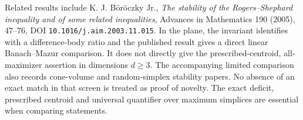 \documentclass[11pt]{article}
\begin{document}
Related results include K. J. B\"or\"oczky Jr.,
\emph{The stability of the Rogers--Shephard inequality and of some related
inequalities}, Advances in Mathematics 190 (2005), 47--76,
DOI \nolinkurl{10.1016/j.aim.2003.11.015}. In the plane, the invariant identifies
with a difference-body ratio and the published result gives a direct linear
Banach--Mazur comparison. It does not directly give the prescribed-centroid,
all-maximizer assertion in dimensions $d\ge3$. The accompanying limited
comparison also records cone-volume and random-simplex stability papers.
No absence of an exact match in that screen is treated as proof of novelty.
The exact deficit, prescribed centroid and universal quantifier over maximum
simplices are essential when comparing statements.
\end{document}
